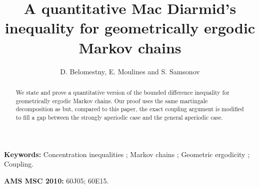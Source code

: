 \documentclass[leqno,11pt,a4paper]{article}
\begin{document}
\title{A quantitative Mac Diarmid's inequality for geometrically ergodic Markov chains}
\author{D. Belomestny, E. Moulines and S. Samsonov}
\maketitle

\begin{abstract}
 We state and prove a quantitative version of the bounded difference inequality for geometrically ergodic Markov chains.
 Our proof uses the same martingale decomposition as \cite{MR3407208} but, compared to this paper, the exact coupling argument is modified to fill a gap between the strongly aperiodic case and the general aperiodic case.
\end{abstract}


\noindent
{\small {\bf Keywords:} Concentration inequalities ; Markov chains ; Geometric ergodicity ; Coupling.}

\noindent
{\small {\bf AMS MSC 2010:} 60J05; 60E15.}
\end{document}
